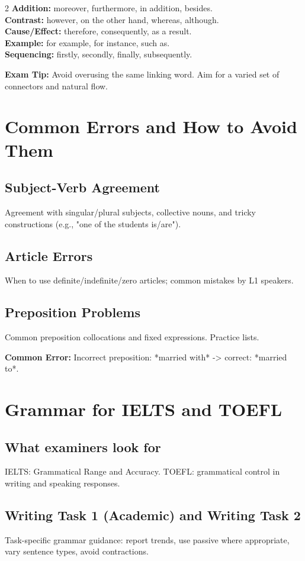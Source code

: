 \documentclass[12pt,oneside]{book}
\newcommand{\tip}[1]{\begin{examptip}\textbf{Exam Tip:} #1\end{examptip}}
\newcommand{\cerror}[1]{\begin{commonerr}\textbf{Common Error:} #1\end{commonerr}}
\begin{document}
\begin{multicols}{2}
\textbf{Addition:} moreover, furthermore, in addition, besides.\\
\textbf{Contrast:} however, on the other hand, whereas, although.\\
\textbf{Cause/Effect:} therefore, consequently, as a result.\\
\textbf{Example:} for example, for instance, such as.\\
\textbf{Sequencing:} firstly, secondly, finally, subsequently.
\end{multicols}

\tip{Avoid overusing the same linking word. Aim for a varied set of connectors and natural flow.}

\chapter{Common Errors and How to Avoid Them}
\section{Subject-Verb Agreement}
Agreement with singular/plural subjects, collective nouns, and tricky constructions (e.g., "one of the students is/are").

\section{Article Errors}
When to use definite/indefinite/zero articles; common mistakes by L1 speakers.

\section{Preposition Problems}
Common preposition collocations and fixed expressions. Practice lists.

\cerror{Incorrect preposition: *married with* -> correct: *married to*.}

\chapter{Grammar for IELTS and TOEFL}
\section{What examiners look for}
IELTS: Grammatical Range and Accuracy. TOEFL: grammatical control in writing and speaking responses.

\section{Writing Task 1 (Academic) and Writing Task 2}
Task-specific grammar guidance: report trends, use passive where appropriate, vary sentence types, avoid contractions.
\end{document}
